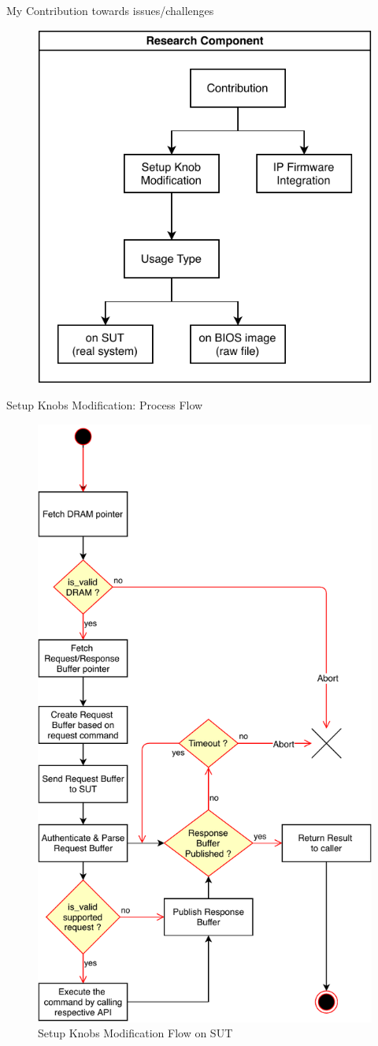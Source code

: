 
\begin{frame}{My Contribution towards issues/challenges}
    \begin{figure}
        \centering
        \includegraphics[width=0.6\linewidth]{Im/figures/research-component.pdf}
    \end{figure}
\end{frame}

\begin{frame}[allowframebreaks]{Setup Knobs Modification: Process Flow}
    \begin{figure}[htbp]
        \centering
        \includegraphics[width=0.3\linewidth]{Im/figures/setup-knobs-flow.pdf}
        \caption{Setup Knobs Modification Flow on SUT}
        \label{fig:setup-knobs-flow}
    \end{figure}
    
\end{frame}


